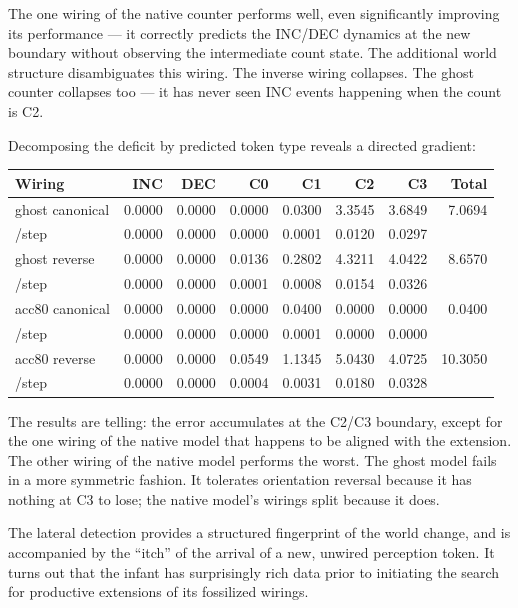 \documentclass[12pt, a4paper]{article}
\begin{document}
The one wiring of the native counter performs well, even significantly
improving its performance --- it correctly predicts the INC/DEC dynamics at
the new boundary without observing the intermediate count state. The additional
world structure disambiguates this wiring. The inverse wiring collapses. The
ghost counter collapses too --- it has never seen INC events happening when the
count is C2.

Decomposing the deficit by predicted token type reveals a directed gradient:

\begin{center}
\small
\begin{tabular}{lrrrrrrr}
\toprule
Wiring & INC & DEC & C0 & C1 & C2 & C3 & Total \\
\midrule
ghost canonical  & 0.0000 & 0.0000 & 0.0000 & 0.0300 & 3.3545 & 3.6849 & 7.0694 \\
/step   & 0.0000 & 0.0000 & 0.0000 & 0.0001 & 0.0120 & 0.0297 &        \\
ghost reverse    & 0.0000 & 0.0000 & 0.0136 & 0.2802 & 4.3211 & 4.0422 & 8.6570 \\
/step   & 0.0000 & 0.0000 & 0.0001 & 0.0008 & 0.0154 & 0.0326 &        \\
acc80 canonical  & 0.0000 & 0.0000 & 0.0000 & 0.0400 & 0.0000 & 0.0000 & 0.0400 \\
/step   & 0.0000 & 0.0000 & 0.0000 & 0.0001 & 0.0000 & 0.0000 &        \\
acc80 reverse    & 0.0000 & 0.0000 & 0.0549 & 1.1345 & 5.0430 & 4.0725 & 10.3050 \\
/step   & 0.0000 & 0.0000 & 0.0004 & 0.0031 & 0.0180 & 0.0328 &        \\
\bottomrule
\end{tabular}
\end{center}

The results are telling: the error accumulates at the C2/C3 boundary, except
for the one wiring of the native model that happens to be aligned with the
extension. The other wiring of the native model performs the worst. The ghost
model fails in a more symmetric fashion. It tolerates orientation reversal
because it has nothing at C3 to lose; the native model's wirings split because
it does.

The lateral detection provides a structured fingerprint of the world change,
and is accompanied by the ``itch'' of the arrival of a new, unwired perception
token. It turns out that the infant has surprisingly rich data prior to
initiating the search for productive extensions of its fossilized wirings.
\end{document}
